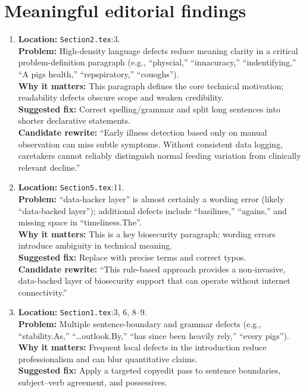 \documentclass[11pt]{article}
\begin{document}
\section*{Meaningful editorial findings}
\begin{enumerate}[leftmargin=*,label=\textbf{E\arabic*.}]
  \item \textbf{Location:} \texttt{Section2.tex}:3.\\
  \textbf{Problem:} High-density language defects reduce meaning clarity in a critical problem-definition paragraph (e.g., ``physcial,'' ``innacuracy,'' ``indentifying,'' ``A pigs health,'' ``repspiratory,'' ``couoghs'').\\
  \textbf{Why it matters:} This paragraph defines the core technical motivation; readability defects obscure scope and weaken credibility.\\
  \textbf{Suggested fix:} Correct spelling/grammar and split long sentences into shorter declarative statements.\\
  \textbf{Candidate rewrite:} ``Early illness detection based only on manual observation can miss subtle symptoms. Without consistent data logging, caretakers cannot reliably distinguish normal feeding variation from clinically relevant decline.''

  \item \textbf{Location:} \texttt{Section5.tex}:11.\\
  \textbf{Problem:} ``data-hacker layer'' is almost certainly a wording error (likely ``data-backed layer''); additional defects include ``basilines,'' ``agains,'' and missing space in ``timeliness.The''.\\
  \textbf{Why it matters:} This is a key biosecurity paragraph; wording errors introduce ambiguity in technical meaning.\\
  \textbf{Suggested fix:} Replace with precise terms and correct typos.\\
  \textbf{Candidate rewrite:} ``This rule-based approach provides a non-invasive, data-backed layer of biosecurity support that can operate without internet connectivity.''

  \item \textbf{Location:} \texttt{Section1.tex}:3, 6, 8--9.\\
  \textbf{Problem:} Multiple sentence-boundary and grammar defects (e.g., ``stability.As,'' ``\ldots outlook.By,'' ``has since been heavily rely,'' ``every pigs'').\\
  \textbf{Why it matters:} Frequent local defects in the introduction reduce professionalism and can blur quantitative claims.\\
  \textbf{Suggested fix:} Apply a targeted copyedit pass to sentence boundaries, subject--verb agreement, and possessives.
\end{enumerate}
\end{document}
